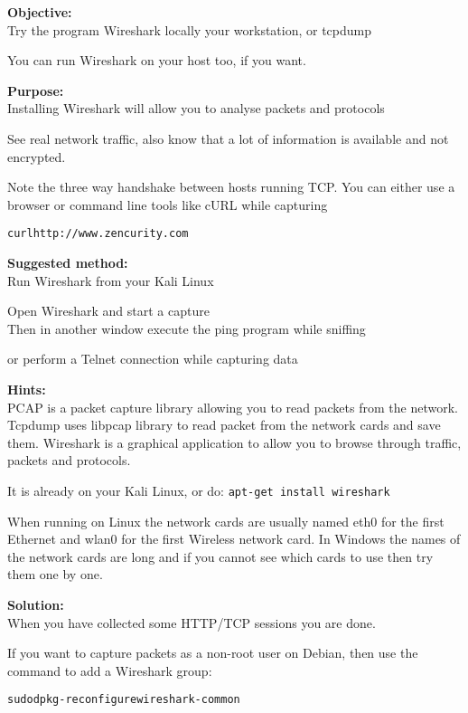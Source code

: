 \documentclass[a4paper,11pt,notitlepage]{report}
\begin{document}


{\bf Objective:}\\
Try the program Wireshark locally your workstation, or tcpdump

You can run Wireshark on your host too, if you want.

{\bf Purpose:}\\
Installing Wireshark will allow you to analyse packets and protocols

See real network traffic, also know that a lot of information is available and not encrypted.

Note the three way handshake between hosts running TCP. You can either use a browser or command line tools like cURL while capturing

\begin{alltt}
curl http://www.zencurity.com
\end{alltt}


{\bf Suggested method:}\\
Run Wireshark from your Kali Linux

Open Wireshark and start a capture\\
Then in another window execute the ping program while sniffing

or perform a Telnet connection while capturing data

{\bf Hints:}\\
PCAP is a packet capture library allowing you to read packets from the network.
Tcpdump uses libpcap library to read packet from the network cards and save them.
Wireshark is a graphical application to allow you to browse through traffic, packets and protocols.

It is already on your Kali Linux, or do: \verb+apt-get install wireshark+

When running on Linux the network cards are usually named eth0 for the first Ethernet and wlan0 for the first Wireless network card. In Windows the names of the network cards are long and if you cannot see which cards to use then try them one by one.

{\bf Solution:}\\
When you have collected some HTTP/TCP sessions you are done.

If you want to capture packets as a non-root user on Debian, then use the command to add a Wireshark group:
\begin{alltt}
sudo dpkg-reconfigure wireshark-common
\end{alltt}
\end{document}
